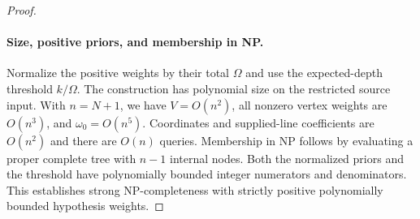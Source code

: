\begin{proof}
\paragraph{Size, positive priors, and membership in NP.}
Normalize the positive weights by their total $\Omega$ and use
the expected-depth threshold $k/\Omega$.
The construction has polynomial size on the restricted source input.
With $n=N+1$, we have $V=O(n^2)$, all nonzero vertex weights are
$O(n^3)$, and $\omega_0=O(n^5)$.
Coordinates and supplied-line coefficients are $O(n^2)$ and there
are $O(n)$ queries. Membership in NP follows by evaluating a
proper complete tree with $n-1$ internal nodes.
Both the normalized priors and the threshold have polynomially
bounded integer numerators and denominators. This establishes
strong NP-completeness with strictly positive polynomially bounded
hypothesis weights.
\end{proof}

